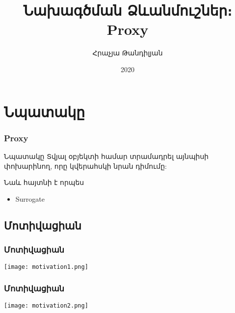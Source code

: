 \documentclass{beamer}
\begin{document}
\title[Proxy]{Նախագծման Ձևանմուշներ։ Proxy}
\author[Հրաչյա Թանդիլյան\copyright]{Հրաչյա Թանդիլյան}
\date{2020}

\begin{frame}
\titlepage
\end{frame}

\section{Նպատակը}
\begin{frame}\frametitle{Proxy}
\begin{block}{Նպատակը}
    Տվյալ օբյեկտի համար տրամադրել այնպիսի փոխարինող, որը կվերահսկի նրան դիմումը:
\end{block}
\vfill
Նաև հայտնի է որպես
\begin{itemize}
    \item Surrogate
\end{itemize}
\end{frame}

\subsection{Մոտիվացիան}
\begin{frame}\frametitle{Մոտիվացիան}
\begin{center}
    \texttt{[image: motivation1.png]}
\end{center}
\end{frame}

\begin{frame}\frametitle{Մոտիվացիան}
\begin{center}
    \texttt{[image: motivation2.png]}
\end{center}
\end{frame}
\end{document}
